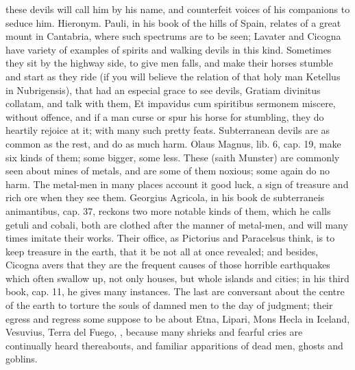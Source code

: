 {these devils will call him by his name, and counterfeit voices of his
companions to seduce him. Hieronym. Pauli, in his book of the hills of
Spain, relates of a great mount in Cantabria, where such
spectrums are to be seen; Lavater and Cicogna have variety of examples
of spirits and walking devils in this kind. Sometimes they sit by the
highway side, to give men falls, and make their horses stumble and
start as they ride (if you will believe the relation of that holy man
Ketellus in Nubrigensis), that had an especial grace to see
devils, Gratiam divinitus collatam, and talk with them, Et impavidus
cum spiritibus sermonem miscere, without offence, and if a man curse or
spur his horse for stumbling, they do heartily rejoice at it; with many
such pretty feats.
Subterranean devils are as common as the rest, and do as much harm.
Olaus Magnus, lib. 6, cap. 19, make six kinds of them; some bigger,
some less. These (saith Munster) are commonly seen about mines of
metals, and are some of them noxious; some again do no harm. The
metal-men in many places account it good luck, a sign of treasure and
rich ore when they see them. Georgius Agricola, in his book de
subterraneis animantibus, cap. 37, reckons two more notable kinds of
them, which he calls getuli and cobali, both are clothed after
the manner of metal-men, and will many times imitate their works. Their
office, as Pictorius and Paracelsus think, is to keep treasure in the
earth, that it be not all at once revealed; and besides, Cicogna
avers that they are the frequent causes of those horrible earthquakes
which often swallow up, not only houses, but whole islands and cities;
in his third book, cap. 11, he gives many instances.
The last are conversant about the centre of the earth to torture the
souls of damned men to the day of judgment; their egress and regress
some suppose to be about Etna, Lipari, Mons Hecla in Iceland, Vesuvius,
Terra del Fuego, \etc{}, because many shrieks and fearful cries are
continually heard thereabouts, and familiar apparitions of dead men,
ghosts and goblins.
}
